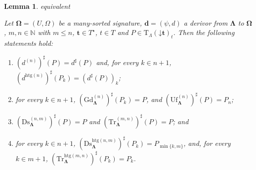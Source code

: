 \documentclass[a4paper, reqno]{amsbook}
\makeatletter
\newcommand{\vs}[1]{\mathbin{\downarrow}#1}
\newcommand{\sig}[1]{\mathbf{#1}}             %
\newcommand{\htg}{\mathrm{htg}}                %
\newcommand{\Gd}{\mathrm{Gd}}
\newcommand{\Uf}{\mathrm{Uf}}
\newcommand{\Ds}{\mathrm{Ds}}
\newcommand{\Tr}{\mathrm{Tr}}
\theoremstyle{plain}
\newtheorem{lemma}[theorem]{Lemma}
\theoremstyle{definition}
\newcommand*{\CA@leanpending}{}
\newcommand*{\CA@leanrelation}{}
\newcommand*{\lean}[2]{%
  \ifcsname\string\color@lean@#1\endcsname\else
    \PackageError{main}{Unknown relation `#1' in \string\lean}{Use equivalent, weaker or stronger.}%
  \fi
  \gdef\CA@leanrelation{#1}%
  \gdef\CA@leanpending{#2}}
\makeatother
\begin{document}
\begin{lemma}\label{LChangeSigTerms}\lean{equivalent}{ChangeOfSignature.homogeneousInclusion_comp,ChangeOfSignature.heterogeneousInclusion_comp,ChangeOfSignature.heterogeneousInclusion_comp_graduation,ChangeOfSignature.homogeneousInclusion_comp_unification,ChangeOfSignature.homogeneousInclusion_comp_discretization,ChangeOfSignature.homogeneousInclusion_comp_truncation,ChangeOfSignature.heterogeneousInclusion_comp_dimension}
Let $\sig{\Omega}=(U,\Omega)$ be a many-sorted signature, $\mathbf{d}=(\psi,d)$ a derivor from $\sig{\Lambda}$ to $\sig{\Omega}$, $m,n\in\mathbb{N}$ with $m\leq n$, $\mathbf{t}\in T^{\star}$, $t\in T$ and $P\in\mathrm{T}_{\Lambda}(\vs{\mathbf{t}})_{t}$.
Then the following statements hold:
\begin{enumerate}
\item $(d^{(n)})^{\sharp}(P)=d^{\sharp}(P)$ and, for every $k\in n+1$, $(d^{\htg(n)})^{\sharp}(P_{k})=(d^{\sharp}(P))_{k}$;
\item for every $k\in n+1$, $(\Gd^{(n)}_{\sig{\Lambda}})^{\sharp}(P_{k})=P$, and $(\Uf^{(n)}_{\sig{\Lambda}})^{\sharp}(P)=P_{n}$;
\item $(\Ds^{(n,m)}_{\sig{\Lambda}})^{\sharp}(P)=P$ and $(\Tr^{(m,n)}_{\sig{\Lambda}})^{\sharp}(P)=P$; and
\item for every $k\in n+1$, $(\Ds^{\htg(n,m)}_{\sig{\Lambda}})^{\sharp}(P_{k})=P_{\min\{k,m\}}$, and, for every $k\in m+1$, $(\Tr^{\htg(m,n)}_{\sig{\Lambda}})^{\sharp}(P_{k})=P_{k}$.
\end{enumerate}
\end{lemma}
\end{document}
